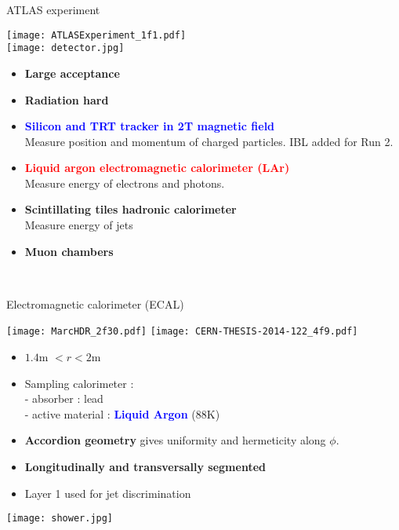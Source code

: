 \begin{frame}{ATLAS experiment}
  \begin{minipage}{0.49\linewidth}
    \texttt{[image: ATLASExperiment\_1f1.pdf]}\\
    \texttt{[image: detector.jpg]}
  \end{minipage}
  \hfill
  \begin{minipage}{0.49\linewidth}
    \begin{itemize}
    \item {\bf Large acceptance}
    \item {\bf Radiation hard}
      \newline
    \item \textcolor{blue}{\bf Silicon and TRT tracker in 2T magnetic field}\\
      Measure position and momentum of charged particles.
      IBL added for Run 2.
    \item \textcolor{red}{\bf Liquid argon electromagnetic calorimeter (LAr)} \\
      Measure energy of electrons and photons.
    \item {\bf Scintillating tiles hadronic calorimeter} \\
      Measure energy of jets
    \item {\bf Muon chambers}
    \end{itemize}
  \end{minipage}\\
\end{frame}

\begin{frame}{ Electromagnetic calorimeter (ECAL) }
  \begin{minipage}{0.4\linewidth}
    \texttt{[image: MarcHDR\_2f30.pdf]}\newline
    \centering
    \texttt{[image: CERN-THESIS-2014-122\_4f9.pdf]}
  \end{minipage}
  \hfill
  \begin{minipage}{0.59\linewidth}
    \begin{itemize}
    \item $1.4$m $<r<2$m
    \item Sampling calorimeter : \\
      - absorber : lead\\
      - active material : \textcolor{blue}{\bf Liquid Argon }($88$K)\\
    \item {\bf Accordion geometry} gives uniformity and hermeticity along $\phi$.
    \item {\bf Longitudinally and transversally segmented}
    \item Layer 1 used for jet discrimination
      
    \end{itemize}
    \centering
    \texttt{[image: shower.jpg]}
  \end{minipage}
\end{frame}


